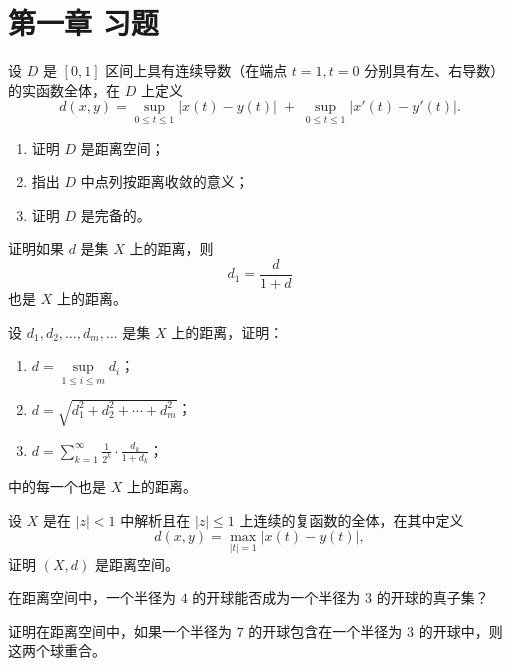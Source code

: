 \section{第一章 习题}

\begin{exercise}
设 $D$ 是 $[0,1]$ 区间上具有连续导数（在端点 $t=1,t=0$ 分别具有左、右导数）的实函数全体，在 $D$ 上定义
\[
d(x,y) = \sup_{0 \leq t \leq 1} |x(t) - y(t)| \;+\; \sup_{0 \leq t \leq 1} |x'(t) - y'(t)|.
\]
\begin{enumerate}
  \item 证明 $D$ 是距离空间；
  \item 指出 $D$ 中点列按距离收敛的意义；
  \item 证明 $D$ 是完备的。
\end{enumerate}
\end{exercise}

\begin{exercise}
证明如果 $d$ 是集 $X$ 上的距离，则
\[
d_1 = \frac{d}{1+d}
\]
也是 $X$ 上的距离。
\end{exercise}
\begin{exercise}
设 $d_1,d_2,\dots,d_m,\dots$ 是集 $X$ 上的距离，证明：

\begin{enumerate}
  \item $d = \sup\limits_{1 \leq i \leq m} d_i$；
  \item $d = \sqrt{d_1^2 + d_2^2 + \cdots + d_m^2}$；
  \item $d = \sum\limits_{k=1}^{\infty} \frac{1}{2^k} \cdot \frac{d_k}{1+d_k}$；
\end{enumerate}

中的每一个也是 $X$ 上的距离。
\end{exercise}

\begin{exercise}
设 $X$ 是在 $|z|<1$ 中解析且在 $|z|\leq 1$ 上连续的复函数的全体，在其中定义
\[
d(x,y) = \max_{|t|=1} |x(t) - y(t)|,
\]
证明 $(X,d)$ 是距离空间。
\end{exercise}

\begin{exercise}
在距离空间中，一个半径为 $4$ 的开球能否成为一个半径为 $3$ 的开球的真子集？
\end{exercise}

\begin{exercise}
证明在距离空间中，如果一个半径为 $7$ 的开球包含在一个半径为 $3$ 的开球中，则这两个球重合。
\end{exercise}

